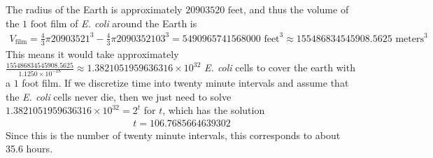 \documentclass{article} %
\theoremstyle{plain}
\numberwithin{equation}{section} %
\numberwithin{figure}{section} %
\numberwithin{table}{section} %
\begin{document}
The radius of the Earth is approximately $20903520 \text{ feet}$, and thus the volume of the $1 \text{ foot}$ film of \emph{E. coli} around the Earth is
\begin{align}
    V_{\text{film}} = \frac{4}{3}\pi 20903521^3 - \frac{4}{3}\pi 2090352103^3 = 5490965741568000 \text{ feet}^3 \approx 155486834545908.5625 \text{ meters}^3
\end{align}
This means it would take approximately $\frac{155486834545908.5625}{1.1250\times10^{-18}} \approx 1.3821051959636316\times 10^{32}$ \emph{E. coli} cells to cover the earth with a $1$ foot film.  If we discretize time into twenty minute intervals and assume that the \emph{E. coli} cells never die, then we just need to solve $1.3821051959636316\times 10^{32} = 2^t$ for $t$, which has the solution
\begin{align}
    t = 106.7685664639302
\end{align}
Since this is the number of twenty minute intervals, this corresponds to about 35.6 hours.
\end{document}

